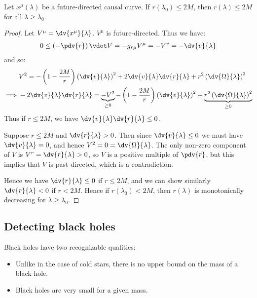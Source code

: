 \documentclass{jknotes}
\begin{document}
\begin{lemma}
    Let \(x^\mu(\lambda)\) be a future-directed causal curve. If \(r(\lambda_0) \le 2M\), then \(r(\lambda) \le 2M\) for all \(\lambda \ge \lambda_0\).
\end{lemma}
\begin{proof}
    Let \(V^\mu = \dv{x^\mu}{\lambda}\). \(V^\mu\) is future-directed. Thus we have:
    \begin{align}
        0 \le \left( -\pdv{r} \right)\vdot V = -g_{r\mu}V^\mu = -V^v = - \dv{v}{\lambda}
    \end{align}
    and so:
    \begin{align}
        & V^2 = -\left(1-\frac{2M}{r}\right) \left( \dv{v}{\lambda} \right)^2 + 2 \dv{v}{\lambda}\dv{r}{\lambda} + r^2 \left( \dv{\Omega}{\lambda} \right)^2 \\
        \implies & -2\dv{v}{\lambda}\dv{r}{\lambda} = \underbrace{-V^2}_{\ge0} - \left( 1-\frac{2M}{r} \right)\left( \dv{v}{\lambda} \right)^2 + \underbrace{r^2\left( \dv{\Omega}{\lambda} \right)^2}_{\ge0}
    \end{align}
    Thus if \(r \le 2M\), we have \(\dv{v}{\lambda}\dv{r}{\lambda}\le0\). 
    
    Suppose \(r \le 2M\) and \(\dv{r}{\lambda} > 0\). Then since \(\dv{v}{\lambda}\le 0\) we must have \(\dv{v}{\lambda} = 0\), and hence \(V^2 = 0 = \dv{\Omega}{\lambda}\). The only non-zero component of \(V\) is \(V^r = \dv{r}{\lambda}>0\), so \(V\) is a positive multiple of \(\pdv{r}\), but this implies that \(V\) is past-directed, which is a contradiction.

    Hence we have \(\dv{r}{\lambda} \le 0\) if \(r \le 2M\), and we can show similarly \(\dv{r}{\lambda} < 0\) if \(r < 2M\). Hence if \(r(\lambda_0) < 2M\), then \(r(\lambda)\) is monotonically decreasing for \(\lambda \ge \lambda_0\). \disapprove
\end{proof} 

\subsection{Detecting black holes}
Black holes have two recognizable qualities:
\begin{itemize}
    \item Unlike in the case of cold stars, there is no upper bound on the mass of a black hole.
    \item Black holes are very small for a given mass.
\end{itemize}
\end{document}
